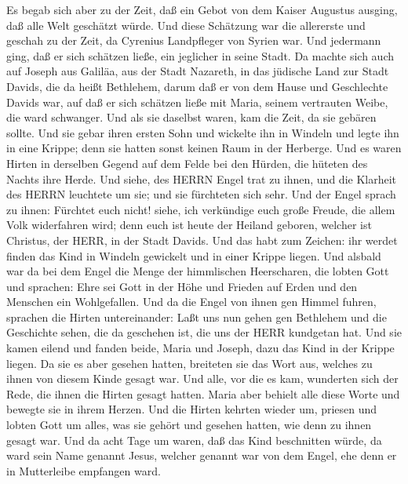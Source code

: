  Es begab sich aber zu der Zeit, daß ein Gebot von dem
Kaiser Augustus ausging, daß alle Welt geschätzt würde.  Und
diese Schätzung war die allererste und geschah zu der Zeit, da Cyrenius
Landpfleger von Syrien war.  Und jedermann ging, daß er sich
schätzen ließe, ein jeglicher in seine Stadt.  Da machte
sich auch auf Joseph aus Galiläa, aus der Stadt Nazareth, in das
jüdische Land zur Stadt Davids, die da heißt Bethlehem, darum daß er von
dem Hause und Geschlechte Davids war,  auf daß er sich
schätzen ließe mit Maria, seinem vertrauten Weibe, die ward schwanger.
 Und als sie daselbst waren, kam die Zeit, da sie gebären
sollte.  Und sie gebar ihren ersten Sohn und wickelte ihn in
Windeln und legte ihn in eine Krippe; denn sie hatten sonst keinen Raum
in der Herberge.  Und es waren Hirten in derselben Gegend
auf dem Felde bei den Hürden, die hüteten des Nachts ihre Herde.
 Und siehe, des HERRN Engel trat zu ihnen, und die Klarheit
des HERRN leuchtete um sie; und sie fürchteten sich sehr. 
Und der Engel sprach zu ihnen: Fürchtet euch nicht! siehe, ich
verkündige euch große Freude, die allem Volk widerfahren wird;
 denn euch ist heute der Heiland geboren, welcher ist
Christus, der HERR, in der Stadt Davids.  Und das habt zum
Zeichen: ihr werdet finden das Kind in Windeln gewickelt und in einer
Krippe liegen.  Und alsbald war da bei dem Engel die Menge
der himmlischen Heerscharen, die lobten Gott und sprachen: 
Ehre sei Gott in der Höhe und Frieden auf Erden und den Menschen ein
Wohlgefallen.  Und da die Engel von ihnen gen Himmel
fuhren, sprachen die Hirten untereinander: Laßt uns nun gehen gen
Bethlehem und die Geschichte sehen, die da geschehen ist, die uns der
HERR kundgetan hat.  Und sie kamen eilend und fanden beide,
Maria und Joseph, dazu das Kind in der Krippe liegen.  Da
sie es aber gesehen hatten, breiteten sie das Wort aus, welches zu ihnen
von diesem Kinde gesagt war.  Und alle, vor die es kam,
wunderten sich der Rede, die ihnen die Hirten gesagt hatten.
 Maria aber behielt alle diese Worte und bewegte sie in
ihrem Herzen.  Und die Hirten kehrten wieder um, priesen
und lobten Gott um alles, was sie gehört und gesehen hatten, wie denn zu
ihnen gesagt war.  Und da acht Tage um waren, daß das Kind
beschnitten würde, da ward sein Name genannt Jesus, welcher genannt war
von dem Engel, ehe denn er in Mutterleibe empfangen ward. 
